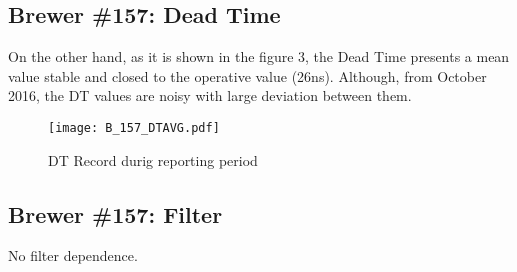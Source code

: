 \documentclass[../main.tex]{subfiles}
\begin{document}
\subsection{Brewer \#157: Dead Time} 
On the other hand, as it is shown in the figure 3, the Dead Time presents a mean value stable and closed to the operative value (26ns). Although, from October 2016, the DT values are noisy with large deviation between them.


\begin{figure}[bh]

\texttt{[image: B\_157\_DTAVG.pdf]}
\label{fig:DT_comp}
\caption{DT Record durig reporting period}
\end{figure}
 
 
\subsection{Brewer \#157: Filter} 

No filter dependence.
 \begin{table}[h]

        {}
       {}
% 
\end{table}
\end{document}

